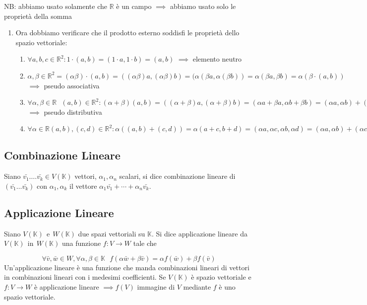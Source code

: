 \documentclass{article}
\begin{document}
NB\@:  abbiamo usato solamente che $\mathbb{R}$ è un campo $\implies$ abbiamo
usato solo le proprietà della somma
\begin{enumerate}
    \item Ora dobbiamo verificare che il prodotto esterno soddisfi le proprietà dello
          spazio vettoriale:
          \begin{enumerate}
              \item $\forall a,b,c \in \mathbb{R}^2 : 1\cdot(a,b)=(1\cdot a, 1\cdot b) = (a,b)$ $\implies$ elemento neutro
              \item $\alpha,\beta \in \mathbb{R}^2 = (\alpha\beta)\cdot(a,b)=((\alpha\beta)a, (\alpha\beta)b) = (\alpha(\beta a, \alpha(\beta b)) = \alpha(\beta a, \beta b) = \alpha(\beta \cdot(a,b))$ $\implies$ pseudo associativa
              \item $\forall \alpha,\beta\in\mathbb{R} \ \ \ (a,b) \in \mathbb{R}^2 : (\alpha+\beta)(a,b) = ((\alpha+\beta)a, (\alpha+\beta)b)=(\alpha a+\beta a, \alpha b + \beta b) = (\alpha a, \alpha b)+(\beta a, \beta b) = \alpha(a,b) + \beta(a,b)$ $\implies$ pseudo distributiva
              \item $\forall \alpha \in \mathbb{R} (a,b) ,(c,d) \in \mathbb{R}^2 : \alpha((a,b)+(c,d)) = \alpha(a+c,b+d)=(\alpha a, \alpha c, \alpha b, \alpha d)=(\alpha a, \alpha b) + (\alpha c, \alpha d) = \alpha(a,b)+\alpha(c,d)$
          \end{enumerate}

\end{enumerate}

\subsection{Combinazione Lineare}
Siano $\bar{v_1}\dots.\bar{v_k}\in V(\mathbb{K})$ vettori, $\alpha_1, \alpha_n$
scalari, si dice combinazione lineare di $(\bar{v_1}\dots\bar{v_k})$ con
$\alpha_1,\alpha_k$ il vettore $\alpha_1\bar{v_1}+\cdots+\alpha_n\bar{v_k}$.

\subsection{Applicazione Lineare}
Siano $V(\mathbb{K}) \ \ \text{e}\ \ W(\mathbb{K})$ due spazi vettoriali su
$\mathbb{K}$. Si dice applicazione lineare da $V(\mathbb{K}) \ \ \text{in} \ \
    W(\mathbb{K})$ una funzione $f:V\rightarrow W$ tale che

\[
    \forall \bar{v}, \bar{w}\in W, \forall\alpha,\beta\in\mathbb{K} \ \ \ f(\alpha\bar{w}+\beta\bar{v})=\alpha f(\bar{w})+\beta f(\bar{v})
\]
Un’applicazione lineare è una funzione che manda combinazioni lineari di vettori in combinazioni lineari con i medesimi coefficienti.
Se $V(\mathbb{K})$ è spazio vettoriale e $f:V\rightarrow W$ è applicazione lineare $\implies f(V)$ immagine di $V$ mediante $f$ è uno spazio vettoriale.
\end{document}

